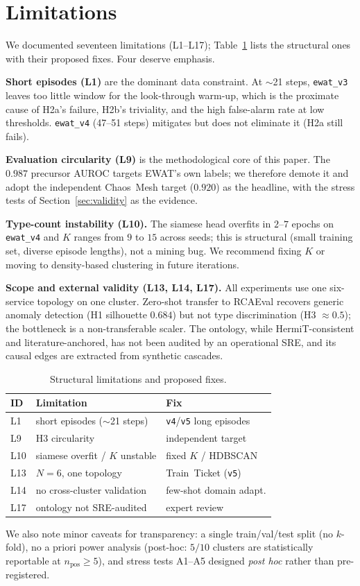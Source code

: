 \section{Limitations}
\label{sec:limitations}

We documented seventeen limitations (L1--L17); Table~\ref{tab:limitations} lists the structural
ones with their proposed fixes. Four deserve emphasis.

\textbf{Short episodes (L1)} are the dominant data constraint. At $\sim$21 steps, \texttt{ewat\_v3}
leaves too little window for the look-through warm-up, which is the proximate cause of H2a's
failure, H2b's triviality, and the high false-alarm rate at low thresholds. \texttt{ewat\_v4}
(47--51 steps) mitigates but does not eliminate it (H2a still fails).

\textbf{Evaluation circularity (L9)} is the methodological core of this paper. The
$0.987$ precursor AUROC targets EWAT's own labels; we therefore demote it and adopt the independent
Chaos~Mesh target ($0.920$) as the headline, with the stress tests of Section~\ref{sec:validity} as
the evidence.

\textbf{Type-count instability (L10).} The siamese head overfits in $2$--$7$ epochs on
\texttt{ewat\_v4} and $K$ ranges from $9$ to $15$ across seeds; this is structural (small training
set, diverse episode lengths), not a mining bug. We recommend fixing $K$ or moving to density-based
clustering in future iterations.

\textbf{Scope and external validity (L13, L14, L17).} All experiments use one six-service topology
on one cluster. Zero-shot transfer to RCAEval recovers generic anomaly detection (H1 silhouette
$0.684$) but not type discrimination (H3 $\approx 0.5$); the bottleneck is a non-transferable
scaler. The ontology, while HermiT-consistent and literature-anchored, has not been audited by an
operational SRE, and its causal edges are extracted from synthetic cascades.

\begin{table}[t]
\centering
\caption{Structural limitations and proposed fixes.}
\label{tab:limitations}
\small
\begin{tabularx}{\columnwidth}{@{}lXl@{}}
\toprule
\textbf{ID} & \textbf{Limitation} & \textbf{Fix} \\
\midrule
L1  & short episodes ($\sim$21 steps)      & \texttt{v4}/\texttt{v5} long episodes \\
L9  & H3 circularity                        & independent target \\
L10 & siamese overfit / $K$ unstable        & fixed $K$ / HDBSCAN \\
L13 & $N=6$, one topology                   & Train~Ticket (\texttt{v5}) \\
L14 & no cross-cluster validation           & few-shot domain adapt. \\
L17 & ontology not SRE-audited              & expert review \\
\bottomrule
\end{tabularx}
\end{table}

We also note minor caveats for transparency: a single train/val/test split (no $k$-fold), no a
priori power analysis (post-hoc: $5/10$ clusters are statistically reportable at $n_{\text{pos}}\geq
5$), and stress tests A1--A5 designed \emph{post hoc} rather than pre-registered.
